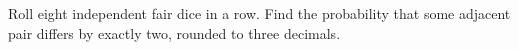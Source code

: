 Roll eight independent fair dice in a row. Find the probability that some adjacent pair differs by exactly two, rounded to three decimals.
